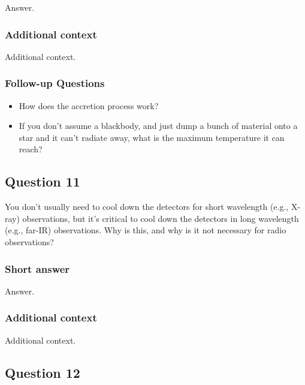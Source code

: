 \documentclass[a4paper,10pt]{article}
\begin{document}
Answer.

\subsubsection{Additional context}

Additional context.

\subsubsection{Follow-up Questions}

\begin{itemize}
    \item How does the accretion process work?
    \item If you don't assume a blackbody, and just dump a bunch of material onto a star and it can't radiate away, what is the maximum temperature it can reach?
\end{itemize}


\newpage
\subsection{Question 11}

You don't usually need to cool down the detectors for short wavelength (e.g., X-ray) observations, but it's critical to cool down the detectors in long wavelength (e.g., far-IR) observations. Why is this, and why is it not necessary for radio observations?

\subsubsection{Short answer}

Answer.

\subsubsection{Additional context}

Additional context.

\newpage
\subsection{Question 12}
\end{document}
